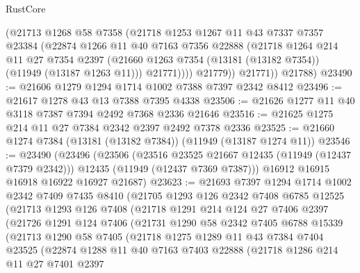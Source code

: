 \begin{lexlean}{RustCore}
\begin{coremodule}
              (@21713
                @1268
                @58
                @7358
                (@21718
                  @1253
                  @1267
                  @11
                  @43
                  @7337
                  @7357
                  @23384
                  (@22874
                    @1266
                    @11
                    @40
                    @7163
                    @7356
                    @22888
                    (@21718
                      @1264
                      @214
                      @11
                      @27
                      @7354
                      @2397
                      (@21660 @1263 @7354 (@13181 (@13182 @7354)) (@11949 (@13187 @1263 @11)))
                      @21771))))
              @21779))
          @21771))
      @21788)
@23490 := @21606 @1279 @1294 @1714 @1002 @7388 @7397 @2342 @8412
@23496 := @21617 @1278 @43 @13 @7388 @7395 @4338
@23506 := @21626 @1277 @11 @40 @3118 @7387 @7394 @2492 @7368 @2336 @21646
@23516 := @21625 @1275 @214 @11 @27 @7384 @2342 @2397 @2492 @7378 @2336
@23525 := @21660 @1274 @7384 (@13181 (@13182 @7384)) (@11949 (@13187 @1274 @11))
@23546 := @23490
    (@23496
      (@23506
        (@23516 @23525 @21667 @12435 (@11949 (@12437 @7379 @2342)))
        @12435
        (@11949 (@12437 @7369 @7387)))
      @16912
      @16915
      @16918
      @16922
      @16927
      @21687)
@23623 := @21693
    @7397
    @1294
    @1714
    @1002
    @2342
    @7409
    @7435
    @8410
    (@21705
      @1293
      @126
      @2342
      @7408
      @6785
      @12525
      (@21713
        @1293
        @126
        @7408
        (@21718
          @1291
          @214
          @124
          @27
          @7406
          @2397
          (@21726
            @1291
            @124
            @7406
            (@21731
              @1290
              @58
              @2342
              @7405
              @6788
              @15339
              (@21713
                @1290
                @58
                @7405
                (@21718
                  @1275
                  @1289
                  @11
                  @43
                  @7384
                  @7404
                  @23525
                  (@22874
                    @1288
                    @11
                    @40
                    @7163
                    @7403
                    @22888
                    (@21718
                      @1286
                      @214
                      @11
                      @27
                      @7401
                      @2397

\end{coremodule}
\end{lexlean}
